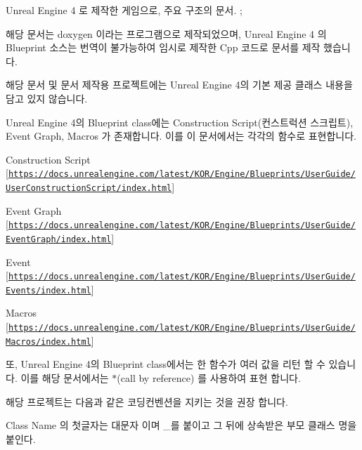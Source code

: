 Unreal Engine 4 로 제작한 게임으로, 주요 구조의 문서. ;

해당 문서는 \textquotesingle{}doxygen\textquotesingle{} 이라는 프로그램으로 제작되었으며, Unreal Engine 4 의 Blueprint 소스는 번역이 불가능하여 임시로 제작한 Cpp 코드로 문서를 제작 했습니다.

해당 문서 및 문서 제작용 프로젝트에는 Unreal Engine 4의 기본 제공 클래스 내용을 담고 있지 않습니다.

Unreal Engine 4의 Blueprint class에는 Construction Script(컨스트럭션 스크립트), Event Graph, Macros 가 존재합니다. 이를 이 문서에서는 각각의 함수로 표현합니다.


\begin{DoxyItemize}
\item Construction Script \mbox{[}\href{https://docs.unrealengine.com/latest/KOR/Engine/Blueprints/UserGuide/UserConstructionScript/index.html}{\tt https\+://docs.\+unrealengine.\+com/latest/\+K\+O\+R/\+Engine/\+Blueprints/\+User\+Guide/\+User\+Construction\+Script/index.\+html}\mbox{]}
\item Event Graph \mbox{[}\href{https://docs.unrealengine.com/latest/KOR/Engine/Blueprints/UserGuide/EventGraph/index.html}{\tt https\+://docs.\+unrealengine.\+com/latest/\+K\+O\+R/\+Engine/\+Blueprints/\+User\+Guide/\+Event\+Graph/index.\+html}\mbox{]}
\item Event \mbox{[}\href{https://docs.unrealengine.com/latest/KOR/Engine/Blueprints/UserGuide/Events/index.html}{\tt https\+://docs.\+unrealengine.\+com/latest/\+K\+O\+R/\+Engine/\+Blueprints/\+User\+Guide/\+Events/index.\+html}\mbox{]}
\item Macros \mbox{[}\href{https://docs.unrealengine.com/latest/KOR/Engine/Blueprints/UserGuide/Macros/index.html}{\tt https\+://docs.\+unrealengine.\+com/latest/\+K\+O\+R/\+Engine/\+Blueprints/\+User\+Guide/\+Macros/index.\+html}\mbox{]}
\end{DoxyItemize}

또, Unreal Engine 4의 Blueprint class에서는 한 함수가 여러 값을 리턴 할 수 있습니다. 이를 해당 문서에서는 \textquotesingle{}$\ast$\textquotesingle{}(call by reference) 를 사용하여 표현 합니다.

해당 프로젝트는 다음과 같은 코딩컨벤션을 지키는 것을 권장 합니다.


\begin{DoxyItemize}
\item Class Name 의 첫글자는 대문자 이며 \textquotesingle{}\+\_\+\textquotesingle{}를 붙이고 그 뒤에 상속받은 부모 클래스 명을 붙인다.
\item 
\item 
\end{DoxyItemize}
